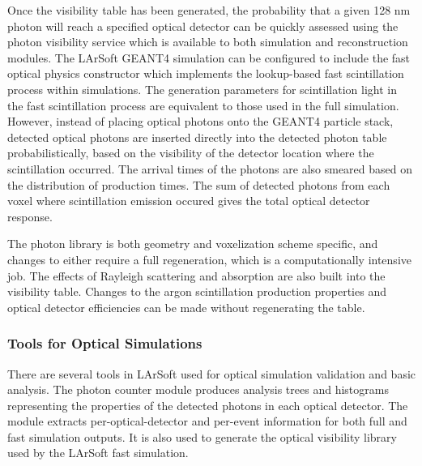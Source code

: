 \documentclass[12pt]{elsarticle}
\begin{document}
Once the visibility table has been generated, the probability that a given 128 nm photon will reach a specified optical detector can be quickly assessed using the photon visibility service which is available to both simulation and reconstruction modules.  The LArSoft GEANT4 simulation can be configured to include the fast optical physics constructor which implements the lookup-based fast scintillation process within simulations. The generation parameters for scintillation light in the fast scintillation process are equivalent to those used in the full simulation.  However, instead of placing optical photons onto the GEANT4 particle stack, detected optical photons are inserted directly into the detected photon table probabilistically, based on the visibility of the detector location where the scintillation occurred.  The arrival times of the photons are also smeared based on the distribution of production times.  The sum of detected photons from each voxel where scintillation emission occured gives the total optical detector response.

The photon library is both geometry and voxelization scheme specific, and changes to either require a full regeneration, which is a computationally intensive job.  The effects of Rayleigh scattering and absorption are also built into the visibility table.  Changes to the argon scintillation production properties and optical detector efficiencies can be made without regenerating the table.

\subsubsection{Tools for Optical Simulations}

There are several tools in LArSoft used for optical simulation validation and basic analysis.  The photon counter module produces analysis trees and histograms representing the properties of the detected photons in each optical detector.  The module extracts per-optical-detector and per-event information for both full and fast simulation outputs.  It is also used to generate the optical visibility library used by the LArSoft fast simulation.
\end{document}
